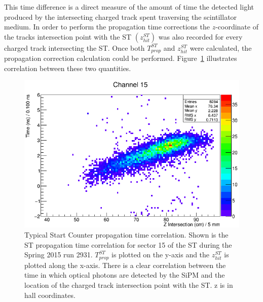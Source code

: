 {This time difference is a direct measure of the amount of time the detected light produced by the intersecting charged track spent traversing the scintillator medium.  In order to perform the propagation time corrections the $z$-coordinate of the tracks intersection point with the ST $(z^{ST}_{hit})$ was also recorded for every charged track intersecting the ST.  Once both $T^{ST}_{prop}$ and $z^{ST}_{hit}$ were calculated, the propagation correction calculation could be performed.  Figure~\ref{fig:proptimeuncorr} illustrates correlation between these two quantities.
	\begin{figure}[!htb]
		\centering
		\includegraphics[width=1.0\columnwidth]{calibration/figs/prop_time_uncorr}
		\caption{Typical Start Counter propagation time correlation.  Shown is the ST propagation time correlation for sector 15 of the ST during the Spring 2015 run 2931. $T^{ST}_{prop}$ is plotted on the y-axis and the $z^{ST}_{hit}$ is plotted along the x-axis. There is a clear correlation between the time in which optical photons are detected by the SiPM and the location of the charged track intersection point with the ST.  z is in hall coordinates.}
		\label{fig:proptimeuncorr}
	\end{figure}

}

